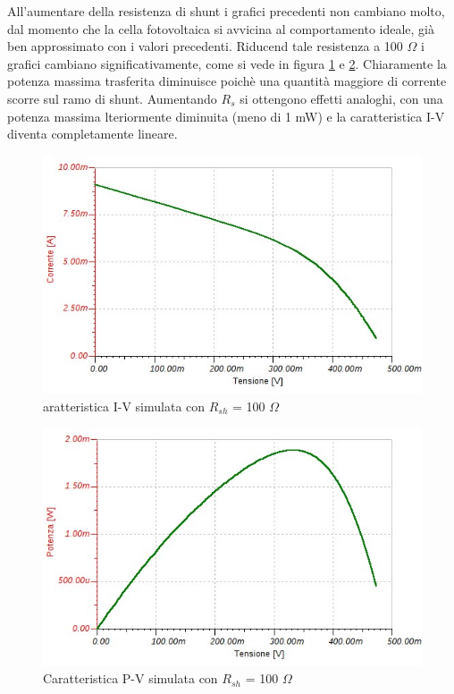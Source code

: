 \documentclass[journal, a4paper]{IEEEtran}
\begin{document}
All'aumentare della resistenza di shunt i grafici precedenti non cambiano molto, dal momento che la cella fotovoltaica si avvicina al comportamento ideale, già ben approssimato con i valori precedenti. Riducend tale resistenza a 100 $\Omega$ i grafici cambiano significativamente, come si vede in figura \ref{fig:ivchar2} e \ref{fig:pvchar2}. Chiaramente la potenza massima trasferita diminuisce poichè una quantità maggiore di corrente scorre sul ramo di shunt. Aumentando $R_s$ si ottengono effetti analoghi, con una potenza massima lteriormente diminuita (meno di 1 mW) e la caratteristica I-V diventa completamente lineare.\\

\begin{figure}[htp]
\centering
\includegraphics[scale=.4]{ivchar2}
\caption{aratteristica I-V simulata con $R_{sh}$ = 100 $\Omega$}
\label{fig:ivchar2}
\end{figure}

\begin{figure}[htp]
\centering
\includegraphics[scale=.4]{pvchar2}
\caption{Caratteristica P-V simulata con $R_{sh}$ = 100 $\Omega$}
\label{fig:pvchar2}
\end{figure}
\end{document}
